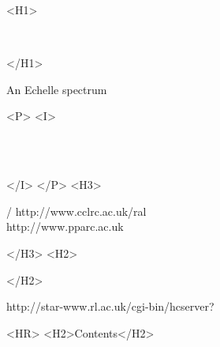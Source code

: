 \begin{htmlonly}
   \xlabel{}
   \begin{rawhtml} <H1> \end{rawhtml}
      \stardoctitle\\
   \begin{rawhtml} </H1> \end{rawhtml}

   \begin{figure}[h]
   \epsfysize=120mm
   \end{figure}

   An Echelle spectrum

   \begin{rawhtml} <P> <I> \end{rawhtml}
   \stardoccategory \stardocnumber \\
   \stardocauthors \\
   \stardocdate
   \begin{rawhtml} </I> </P> <H3> \end{rawhtml}
       /
                        {http://www.cclrc.ac.uk/ral} \\
                        {http://www.pparc.ac.uk} \\
   \begin{rawhtml} </H3> <H2> \end{rawhtml}
   \begin{rawhtml} </H2> \end{rawhtml}
      {http://star-www.rl.ac.uk/cgi-bin/hcserver?\stardocsource}\\

  \label{stardoccontents}
  \begin{rawhtml}
    <HR>
    <H2>Contents</H2>
  \end{rawhtml}
  \renewcommand{\latexonlytoc}[0]{}

\end{htmlonly}

